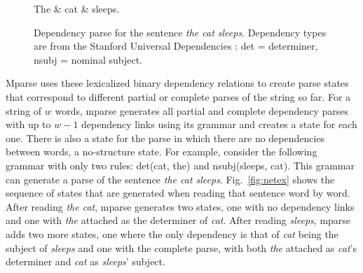\documentclass[a4paper, 12pt]{article}
\begin{document}
\begin{figure}[hbtp]
\centering
\begin{dependency}[theme=simple, font=\normalsize, label style={font=\normalsize}]
\begin{deptext}[column sep=1em]
The \& cat \& sleeps.\\
\end{deptext}
\end{dependency}
\caption{Dependency parse for the sentence \emph{the cat sleeps}. Dependency
    types are from the Stanford Universal Dependencies
    \citep{demarneffe2014universal}: det = determiner, nsubj = nominal
    subject.}\label{fig:depex}
\end{figure}

Mparse uses these lexicalized binary dependency relations to create parse
states that correspond to different partial or complete parses of the string so
far. For a string of $w$ words, mparse generates all partial and complete
dependency parses with up to $w - 1$ dependency links using its grammar and
creates a state for each one. There is also a state for the parse in which
there are no dependencies between words, a no-structure state. For example,
consider the following grammar with only two rules: det(cat, the) and
nsubj(sleeps, cat). This grammar can generate a parse of the sentence \emph{the
    cat sleeps}. Fig.~\ref{fig:netex} shows the sequence of states that are
generated when reading that sentence word by word. After reading \emph{the
    cat}, mparse generates two states, one with no dependency links and one
with \emph{the} attached as the determiner of \emph{cat}. After reading
\emph{sleeps}, mparse adds two more states, one where the only dependency is
that of \emph{cat} being the subject of \emph{sleeps} and one with the complete
parse, with both \emph{the} attached as \emph{cat}'s determiner and \emph{cat}
as \emph{sleeps}' subject.%
\end{document}
